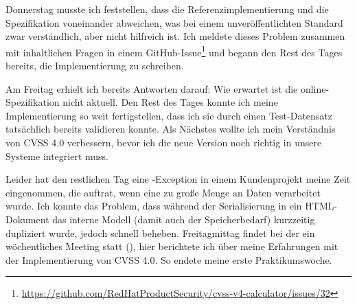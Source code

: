 \sweekdaymarginpar{\weekdayThursdayLong}

Donnerstag musste ich feststellen, dass die Referenzimplementierung und die Spezifikation voneinander abweichen, was bei einem unveröffentlichten Standard zwar verständlich, aber nicht hilfreich ist.
Ich meldete dieses Problem zusammen mit inhaltlichen Fragen in einem GitHub-Issue\footnote{\url{https://github.com/RedHatProductSecurity/cvss-v4-calculator/issues/32}} und begann den Rest des Tages bereits, die Implementierung zu schreiben.

\sweekdaymarginpar{\weekdayFridayLong}

Am Freitag erhielt ich bereits Antworten darauf:
Wie erwartet ist die online-Spezifikation nicht aktuell.
Den Rest des Tages konnte ich meine Implementierung so weit fertigstellen, dass ich sie durch einen Test-Datensatz tatsächlich bereits validieren konnte.
Als Nächstes wollte ich mein Verständnis von CVSS 4.0 verbessern, bevor ich die neue Version noch richtig in unsere Systeme integriert muss.

Leider hat den restlichen Tag eine -Exception in einem Kundenprojekt meine Zeit eingenommen, die auftrat, wenn eine zu große Menge an Daten verarbeitet wurde.
Ich konnte das Problem, dass während der Serialisierung in ein HTML-Dokument das interne Modell (damit auch der Speicherbedarf) kurzzeitig dupliziert wurde, jedoch schnell beheben.
Freitagmittag findet bei der {\metaeffekt} ein wöchentliches Meeting statt (), hier berichtete ich über meine Erfahrungen mit der Implementierung von CVSS 4.0.
So endete meine erste Praktikumswoche.
